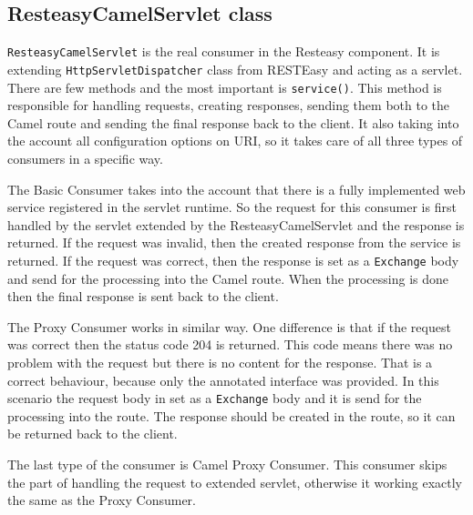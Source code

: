 \documentclass[12pt,final,oneside]{fithesis2}
\begin{document}
\subsection{ResteasyCamelServlet class}\label{servlet}
\texttt{ResteasyCamelServlet} is the real consumer in the Resteasy component. It is extending \texttt{HttpServletDispatcher} class from RESTEasy and acting as a servlet. There are few methods and the most important is \texttt{service()}. This method is responsible for handling requests, creating responses, sending them both to the Camel route and sending the final response back to the client. It also taking into the account all configuration options on URI, so it takes care of all three types of consumers in a specific way. 

The Basic Consumer takes into the account that there is a fully implemented web service registered in the servlet runtime. So the request for this consumer is first handled by the servlet extended by the ResteasyCamelServlet and the response is returned. If the request was invalid, then the created response from the service is returned. If the request was correct, then the response is set as a \texttt{Exchange} body and send for the processing into the Camel route. When the processing is done then the final response is sent back to the client. 

The Proxy Consumer works in similar way. One difference is that if the request was correct then the status code 204 is returned. This code means there was no problem with the request but there is no content for the response\cite{http}. That is a correct behaviour, because only the annotated interface was provided. In this scenario the request body in set as a \texttt{Exchange} body and it is send for the processing into the route. The response should be created in the route, so it can be returned back to the client.


The last type of the consumer is Camel Proxy Consumer. This consumer skips the part of handling the request to extended servlet, otherwise it working exactly the same as the Proxy Consumer.     
\end{document}
